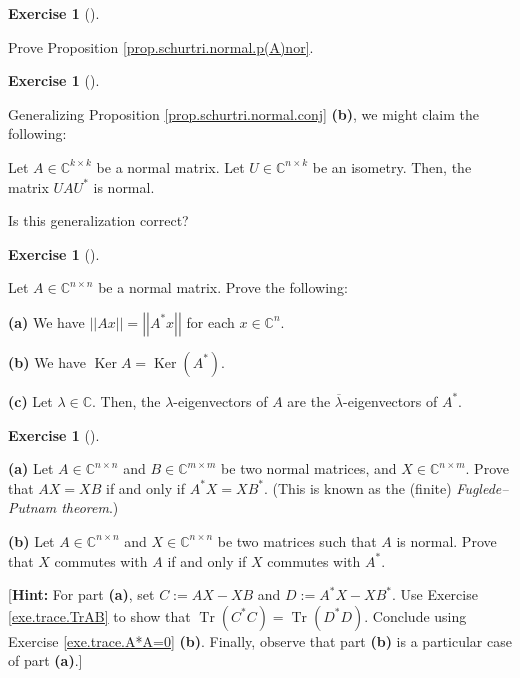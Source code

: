 \documentclass[numbers=enddot,12pt,final,onecolumn,notitlepage]{scrartcl}%
\newcounter{exer}
\numberwithin{exer}{subsection}
\theoremstyle{definition}
\newtheorem{exmp}[exer]{Exercise}
\newenvironment{exercise}[1][]
{\begin{exmp}[#1]\begin{leftbar}}
{\end{leftbar}\end{exmp}}
\begin{document}
\begin{exercise}
\label{exe.schurtri.normal.p(A)nor} Prove Proposition
\ref{prop.schurtri.normal.p(A)nor}.
\end{exercise}

\begin{exercise}
\label{exe.schurtri.normal.isometry} Generalizing Proposition
\ref{prop.schurtri.normal.conj} \textbf{(b)}, we might claim the following:

Let $A\in\mathbb{C}^{k\times k}$ be a normal matrix. Let $U\in\mathbb{C}%
^{n\times k}$ be an isometry. Then, the matrix $UAU^{\ast}$ is normal.

Is this generalization correct?
\end{exercise}

\begin{exercise}
\label{exe.schurtri.normal.A*x} Let $A\in\mathbb{C}^{n\times n}$ be a
normal matrix. Prove the following: \medskip

\textbf{(a)} We have $\left\vert \left\vert Ax\right\vert \right\vert
=\left\vert \left\vert A^{\ast}x\right\vert \right\vert $ for each
$x\in\mathbb{C}^{n}$. \medskip

\textbf{(b)} We have $\operatorname*{Ker}A=\operatorname*{Ker}\left(  A^{\ast
}\right)  $. \medskip

\textbf{(c)} Let $\lambda\in\mathbb{C}$. Then, the $\lambda$-eigenvectors of
$A$ are the $\overline{\lambda}$-eigenvectors of $A^{\ast}$.
\end{exercise}

\begin{exercise}
\label{exe.schurtri.normal.fp} \textbf{(a)} Let $A\in\mathbb{C}%
^{n\times n}$ and $B\in\mathbb{C}^{m\times m}$ be two normal matrices, and
$X\in\mathbb{C}^{n\times m}$. Prove that $AX=XB$ if and only if $A^{\ast
}X=XB^{\ast}$. (This is known as the (finite) \emph{Fuglede--Putnam
theorem}.)\medskip

\textbf{(b)} Let $A\in\mathbb{C}^{n\times n}$ and $X\in\mathbb{C}^{n\times n}$
be two matrices such that $A$ is normal. Prove that $X$ commutes with $A$ if
and only if $X$ commutes with $A^{\ast}$. \medskip

[\textbf{Hint:} For part \textbf{(a)}, set $C:=AX-XB$ and $D:=A^{\ast
}X-XB^{\ast}$. Use Exercise \ref{exe.trace.TrAB} to show that
$\operatorname*{Tr}\left(  C^{\ast}C\right)  =\operatorname*{Tr}\left(
D^{\ast}D\right)  $. Conclude using Exercise \ref{exe.trace.A*A=0}
\textbf{(b)}. Finally, observe that part \textbf{(b)} is a particular case of
part \textbf{(a)}.]
\end{exercise}
\end{document}
